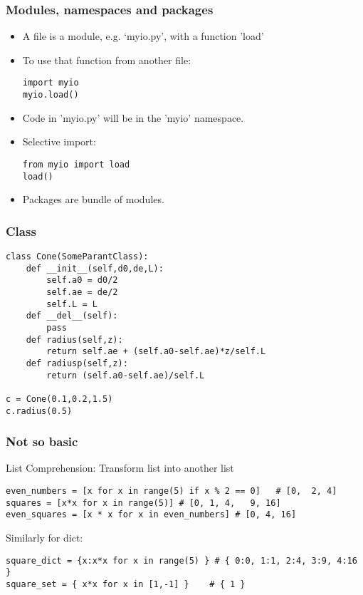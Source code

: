 \begin{frame}[fragile]\frametitle{Modules, namespaces and packages}

  \begin{itemize}
  \item A file is a module, e.g. `myio.py', with a function 'load'
  \item To use that function from another file:
    \begin{lstlisting}
import myio
myio.load()
  \end{lstlisting}
  \item Code in 'myio.py' will be in the 'myio' namespace.
  \item Selective import:
      \begin{lstlisting}
from myio import load
load()
  \end{lstlisting}
\item  Packages are bundle of modules.
  \end{itemize}
\end{frame}

\begin{frame}[fragile]\frametitle{Class}
  \begin{lstlisting}
class Cone(SomeParantClass):
	def __init__(self,d0,de,L):
		self.a0 = d0/2
		self.ae = de/2
		self.L = L
	def __del__(self):
		pass
	def radius(self,z):
		return self.ae + (self.a0-self.ae)*z/self.L
	def radiusp(self,z):
		return (self.a0-self.ae)/self.L

c = Cone(0.1,0.2,1.5)
c.radius(0.5)
  \end{lstlisting}

\end{frame}


\begin{frame}[fragile]\frametitle{Not so basic}
List Comprehension: Transform list into another list
  \begin{lstlisting}
even_numbers = [x for x in range(5) if x % 2 == 0]	 # [0,	2, 4]
squares = [x*x for x in range(5)] # [0, 1, 4,	9, 16]
even_squares = [x * x for x in even_numbers] # [0, 4, 16]
  \end{lstlisting}
Similarly for dict:
  \begin{lstlisting}
square_dict	= {x:x*x for x in range(5) } # { 0:0, 1:1, 2:4, 3:9, 4:16	}
square_set = { x*x for x in [1,-1] }	# { 1 }
  \end{lstlisting}
\end{frame}

